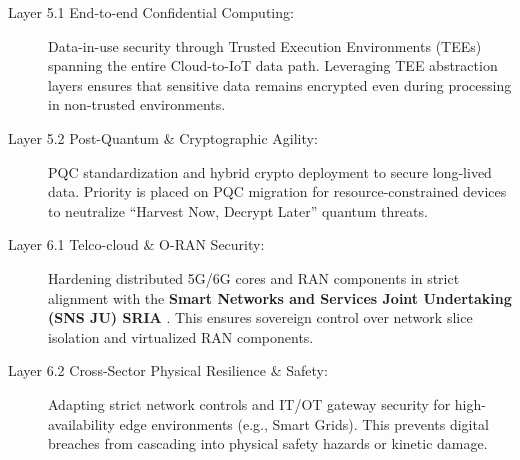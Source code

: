 \documentclass{ieeeaccess}
\begin{document}
\begin{description}
\item[Layer 5.1 End-to-end Confidential Computing:] Data-in-use security through Trusted Execution Environments (TEEs) spanning the entire Cloud-to-IoT data path. Leveraging TEE abstraction layers ensures that sensitive data remains encrypted even during processing in non-trusted environments.

\item[Layer 5.2 Post-Quantum \& Cryptographic Agility:] PQC standardization and hybrid crypto deployment to secure long-lived data. Priority is placed on PQC migration for resource-constrained devices to neutralize ``Harvest Now, Decrypt Later'' quantum threats.

\item[Layer 6.1 Telco-cloud \& O-RAN Security:] Hardening distributed 5G/6G cores and RAN components in strict alignment with the \textbf{Smart Networks and Services Joint Undertaking (SNS JU) SRIA} \cite{snsju}. This ensures sovereign control over network slice isolation and virtualized RAN components.

\item[Layer 6.2 Cross-Sector Physical Resilience \& Safety:] Adapting strict network controls and IT/OT gateway security for high-availability edge environments (e.g., Smart Grids). This prevents digital breaches from cascading into physical safety hazards or kinetic damage.

\end{description}
\end{document}
